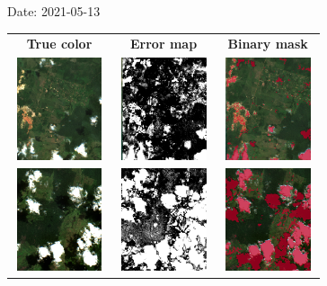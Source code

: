 \documentclass{beamer}
\begin{document}
\begin{frame}{Date: 2021-05-13}
    \begin{tabular}{ccc}
        \textbf{True color} & \textbf{Error map} & \textbf{Binary mask}\\
        \includegraphics[width=2.7cm,height=3cm]{Figures/v6/20210513/TCI_zoom3.png}& \includegraphics[width=2.7cm,height=3cm]{Figures/v6/20210513/error_map_zoom3.png} &\includegraphics[width=2.7cm,height=3cm]{Figures/v6/20210513/zoom3_BI.png}\\
        \includegraphics[width=2.7cm,height=3cm]{Figures/v6/20210513/TCI_zoom4.png}& \includegraphics[width=2.7cm,height=3cm]{Figures/v6/20210513/error_map_zoom4.png} &\includegraphics[width=2.7cm,height=3cm]{Figures/v6/20210513/zoom4_BI.png}\\
        \end{tabular}
\end{frame}
\end{document}
